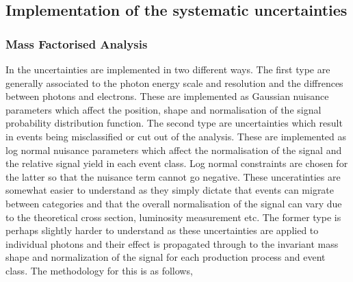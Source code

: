 \subsection{Implementation of the systematic uncertainties}

\subsubsection{Mass Factorised Analysis}

In the \MFM uncertainties are implemented in two different ways. The first type are generally associated to the photon energy scale and resolution and the diffrences between photons and electrons. These are implemented as Gaussian nuisance parameters which affect the position, shape and normalisation of the signal probability distribution function. The second type are uncertainties which result in events being misclassified or cut out of the analysis. These are implemented as log normal nuisance parameters which affect the normalisation of the signal and the relative signal yield in each event class. Log normal constraints are chosen for the latter so that the nuisance term cannot go negative. These unceratinties are somewhat easier to understand as they simply dictate that events can migrate between categories and that the overall normalisation of the signal can vary due to the theoretical cross section, luminosity measurement etc. The former type is perhaps slightly harder to understand as these uncertainties are applied to individual photons and their effect is propagated through to the invariant mass shape and normalization of the signal for each production process and event class. The methodology for this is as follows,

